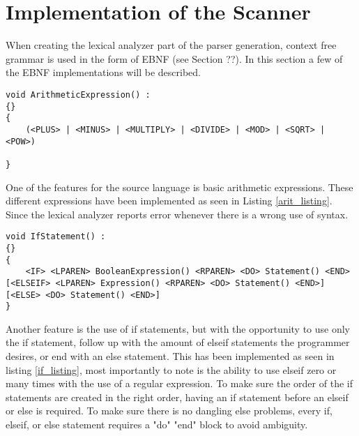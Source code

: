 \section{Implementation of the Scanner}
When creating the lexical analyzer part of the parser generation, context free grammar is used in the form of EBNF (see Section ??). In this section a few of the EBNF implementations will be described.
\begin{lstlisting}[label=arit_listing]
void ArithmeticExpression() :
{}
{
	(<PLUS> | <MINUS> | <MULTIPLY> | <DIVIDE> | <MOD> | <SQRT> | <POW>)

}

\end{lstlisting}
One of the features for the source language is basic arithmetic expressions. These different expressions have been implemented as seen in Listing \ref{arit_listing}. Since the lexical analyzer reports error whenever there is a wrong use of syntax.


\begin{lstlisting}[label=if_listing]
void IfStatement() :
{}
{
    <IF> <LPAREN> BooleanExpression() <RPAREN> <DO> Statement() <END> [<ELSEIF> <LPAREN> Expression() <RPAREN> <DO> Statement() <END>] [<ELSE> <DO> Statement() <END>]
}
\end{lstlisting}
Another feature is the use of if statements, but with the opportunity to use only the if statement, follow up with the amount of elseif statements the programmer desires, or end with an else statement. This has been implemented as seen in listing \ref{if_listing}, most importantly to note is the ability to use elseif zero or many times with the use of a regular expression. To make sure the order of the if statements are created in the right order, having an if statement before an elseif or else is required. To make sure there is no dangling else problems, every if, elseif, or else statement requires a "do" "end" block to avoid ambiguity.